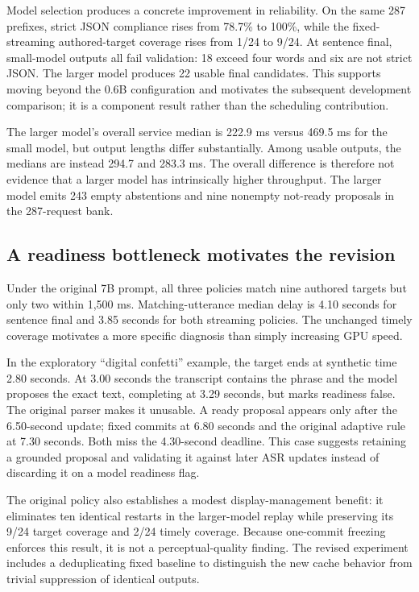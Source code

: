 Model selection produces a concrete improvement in reliability. On the same 287 prefixes, strict JSON compliance rises from 78.7\% to 100\%, while the fixed-streaming authored-target coverage rises from 1/24 to 9/24. At sentence final, small-model outputs all fail validation: 18 exceed four words and six are not strict JSON. The larger model produces 22 usable final candidates. This supports moving beyond the 0.6B configuration and motivates the subsequent development comparison; it is a component result rather than the scheduling contribution.

The larger model's overall service median is 222.9 ms versus 469.5 ms for the small model, but output lengths differ substantially. Among usable outputs, the medians are instead 294.7 and 283.3 ms. The overall difference is therefore not evidence that a larger model has intrinsically higher throughput. The larger model emits 243 empty abstentions and nine nonempty not-ready proposals in the 287-request bank.

\subsection{A readiness bottleneck motivates the revision}
Under the original 7B prompt, all three policies match nine authored targets but only two within 1,500 ms. Matching-utterance median delay is 4.10 seconds for sentence final and 3.85 seconds for both streaming policies. The unchanged timely coverage motivates a more specific diagnosis than simply increasing GPU speed.

In the exploratory ``digital confetti'' example, the target ends at synthetic time 2.80 seconds. At 3.00 seconds the transcript contains the phrase and the model proposes the exact text, completing at 3.29 seconds, but marks readiness false. The original parser makes it unusable. A ready proposal appears only after the 6.50-second update; fixed commits at 6.80 seconds and the original adaptive rule at 7.30 seconds. Both miss the 4.30-second deadline. This case suggests retaining a grounded proposal and validating it against later ASR updates instead of discarding it on a model readiness flag.

The original policy also establishes a modest display-management benefit: it eliminates ten identical restarts in the larger-model replay while preserving its 9/24 target coverage and 2/24 timely coverage. Because one-commit freezing enforces this result, it is not a perceptual-quality finding. The revised experiment includes a deduplicating fixed baseline to distinguish the new cache behavior from trivial suppression of identical outputs.
